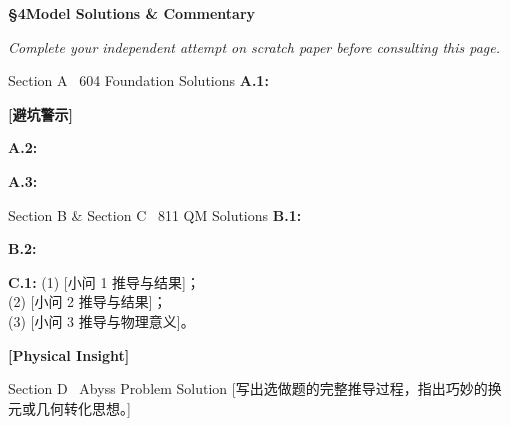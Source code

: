 \documentclass[a4paper,11pt]{article}
\newcommand{\alerttag}[1]{\textcolor{wine}{\sffamily\bfseries [#1]}}
\begin{document}
\clearpage

{\Large\sffamily\bfseries\color{navy} \S 4\quad Model Solutions \& Commentary}

\vspace{1pt}
{\small\color{mist}\itshape\hspace{1pt} Complete your independent attempt on scratch paper before consulting this page.}

\vspace{5pt}

\begin{solution}{Section A \textperiodcentered\ 604 Foundation Solutions}
\textbf{A.1:}\enspace [写出严密推导与最终化简结果。]
\begin{warnbox}
\alerttag{避坑警示}
\end{warnbox}

\vspace{1mm}
\textbf{A.2:}

\vspace{1mm}
\textbf{A.3:}\enspace [写出一阶线性常微分方程通解推导。]
\end{solution}

\vspace{3pt}

\begin{solution}{Section B \& Section C \textperiodcentered\ 811 QM Solutions}
\textbf{B.1:}\enspace [概念正误判断与一句话物理原理解释。]

\vspace{1mm}
\textbf{B.2:}\enspace [概率流密度或守恒律的物理图像白话阐述。]

\vspace{1mm}
\textbf{C.1:}\enspace
(1) [小问 1 推导与结果]；\\
(2) [小问 2 推导与结果]；\\
(3) [小问 3 推导与物理意义]。
\begin{notebox}
\alerttag{Physical Insight}
\end{notebox}
\end{solution}

\vspace{3pt}

\begin{solution}{Section D \textperiodcentered\ Abyss Problem Solution}
[写出选做题的完整推导过程，指出巧妙的换元或几何转化思想。]
\end{solution}
\end{document}
